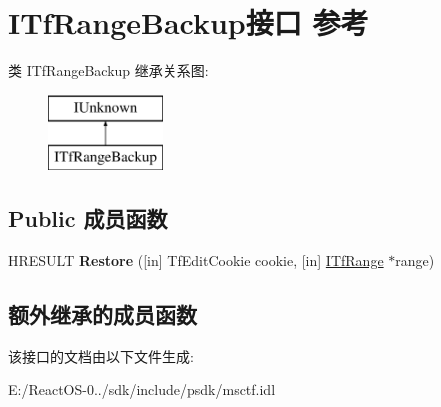 \hypertarget{interface_i_tf_range_backup}{}\section{I\+Tf\+Range\+Backup接口 参考}
\label{interface_i_tf_range_backup}
类 I\+Tf\+Range\+Backup 继承关系图\+:\begin{figure}[H]
\begin{center}
\leavevmode
\includegraphics[height=2.000000cm]{interface_i_tf_range_backup}
\end{center}
\end{figure}
\subsection*{Public 成员函数}
\begin{DoxyCompactItemize}
\item 
\mbox{\label{interface_i_tf_range_backup_ac95acf85e53985a98fe18c08325c2d69}} 
H\+R\+E\+S\+U\+LT {\bfseries Restore} (\mbox{[}in\mbox{]} Tf\+Edit\+Cookie cookie, \mbox{[}in\mbox{]} \hyperlink{interface_i_tf_range}{I\+Tf\+Range} $\ast$range)
\end{DoxyCompactItemize}
\subsection*{额外继承的成员函数}


该接口的文档由以下文件生成\+:\begin{DoxyCompactItemize}
\item 
E\+:/\+React\+O\+S-\/0../sdk/include/psdk/msctf.\+idl\end{DoxyCompactItemize}
